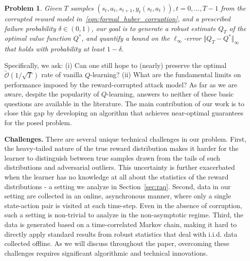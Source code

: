 \documentclass{article}
\newcommand{\mc}{\mathcal}
\newtheorem{problem}{Problem}
\begin{document}

\begin{problem}
Given $T$ samples $(s_t, a_t, s_{t+1}, y_t(s_t, a_t)), t = 0, \ldots, T-1$ from the corrupted reward model in~\eqref{eqn:formal_huber_corruption}, and a prescribed failure probability $\delta \in (0,1)$, our goal is to generate a robust estimate ${Q}_T$ of the optimal value function $Q^*$, and quantify a bound on the $\ell_{\infty}$-error  $\Vert {Q}_T - Q^* \Vert_{\infty}$ that holds with probability at least $1-\delta.$
\end{problem}

Specifically, we ask: (i) Can one still hope to (nearly) preserve the optimal $\widetilde{\mc{O}}(1/\sqrt{T})$ rate of vanilla \(Q\)-learning? (ii) What are the fundamental limits on performance imposed by the reward-corrupted attack model? As far as we are aware, despite the popularity of \(Q\)-learning, answers to neither of these basic questions are available in the literature. The main contribution of our work is to close this gap by developing an algorithm that achieves near-optimal guarantees for the posed problem. 

\textbf{Challenges.} There are several unique technical challenges in our problem. First, the heavy-tailed nature of the true reward distribution makes it harder for the learner to distinguish between true samples drawn from the tails of such distributions and adversarial outliers. This uncertainty is further exacerbated when the learner has no knowledge at all about the statistics of the reward distributions - a setting we analyze in Section~\ref{sec:raq}. Second, data in our setting are collected in an online, asynchronous manner, where only a single state-action pair is visited at each time-step. Even in the absence of corruption, such a setting is non-trivial to analyze in the non-asymptotic regime. Third, the data is generated based on a time-correlated Markov chain, making it hard to directly apply standard results from robust statistics that deal with i.i.d. data collected offline. As we will discuss throughout the paper, overcoming these challenges requires significant algorithmic and technical innovations. 
\end{document}
